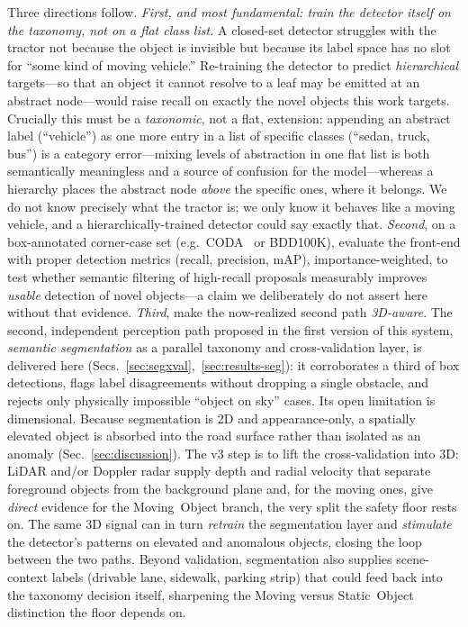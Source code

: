 \documentclass[conference]{IEEEtran}
\begin{document}
Three directions follow. \emph{First, and most fundamental: train the detector
itself on the taxonomy, not on a flat class list.} A closed-set detector
struggles with the tractor not because the object is invisible but because its
label space has no slot for ``some kind of moving vehicle.'' Re-training the
detector to predict \emph{hierarchical} targets---so that an object it cannot
resolve to a leaf may be emitted at an abstract node---would raise recall on
exactly the novel objects this work targets. Crucially this must be a
\emph{taxonomic}, not a flat, extension: appending an abstract label
(``vehicle'') as one more entry in a list of specific classes (``sedan, truck,
bus'') is a category error---mixing levels of abstraction in one flat list is
both semantically meaningless and a source of confusion for the model---whereas a
hierarchy places the abstract node \emph{above} the specific ones, where it
belongs. We do not know precisely what the tractor is; we only know it behaves
like a moving vehicle, and a hierarchically-trained detector could say exactly
that. \emph{Second}, on a box-annotated corner-case set (e.g.\ CODA~\cite{li2022}
or BDD100K), evaluate the front-end with proper detection metrics (recall,
precision, mAP), importance-weighted, to test whether semantic filtering of
high-recall proposals measurably improves \emph{usable} detection of novel
objects---a claim we deliberately do not assert here without that evidence.
\emph{Third}, make the now-realized second path \emph{3D-aware}. The second,
independent perception path proposed in the first version of this system,
\emph{semantic segmentation} as a parallel taxonomy and cross-validation
layer, is delivered here (Secs.~\ref{sec:segxval},~\ref{sec:results-seg}): it
corroborates a third of box detections, flags label disagreements without
dropping a single obstacle, and rejects only physically impossible ``object on
sky'' cases. Its open limitation is dimensional. Because segmentation is 2D and
appearance-only, a spatially elevated object is absorbed into the road surface
rather than isolated as an anomaly (Sec.~\ref{sec:discussion}). The v3 step is to
lift the cross-validation into 3D: LiDAR and/or Doppler radar supply depth and
radial velocity that separate foreground objects from the background plane and,
for the moving ones, give \emph{direct} evidence for the \textsf{Moving~Object}
branch, the very split the safety floor rests on. The same 3D signal can in turn
\emph{retrain} the segmentation layer and \emph{stimulate} the detector's
patterns on elevated and anomalous objects, closing the loop between the two
paths. Beyond validation, segmentation also supplies scene-context labels
(drivable lane, sidewalk, parking strip) that could feed back into the taxonomy
decision itself, sharpening the \textsf{Moving} versus \textsf{Static~Object}
distinction the floor depends on.
\end{document}
